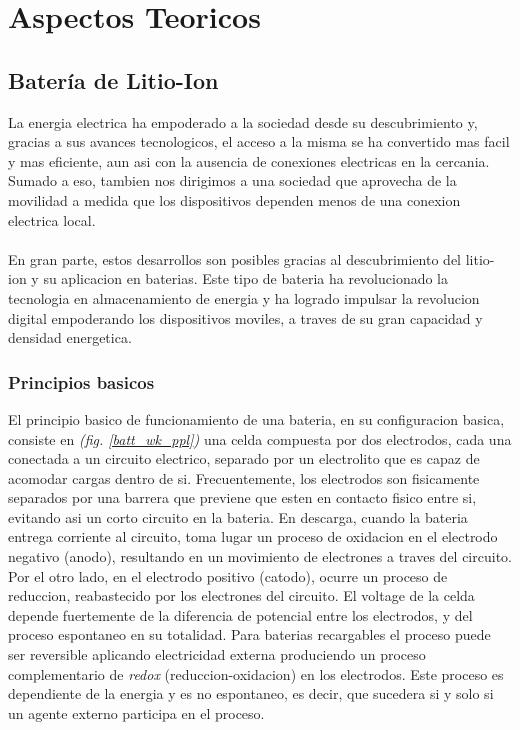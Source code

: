 \documentclass[10pt,a4paper]{article}
\begin{document}
	\clearpage
	
    \section{Aspectos Teoricos}\label{teoria}
	
	\subsection{Batería de Litio-Ion}
    
    La energia electrica ha empoderado a la sociedad desde su 
    descubrimiento y, gracias a sus avances tecnologicos, el acceso a la misma 
    se ha convertido mas facil y mas eficiente, aun asi con la
    ausencia de conexiones electricas en la cercania. Sumado a eso, tambien
    nos dirigimos a una sociedad que aprovecha de la movilidad a medida que los
    dispositivos dependen menos de una conexion electrica local.\\
    \\
    \noindent En gran parte, estos desarrollos son posibles gracias al
    descubrimiento del litio-ion y su aplicacion en baterias. Este tipo de
    bateria ha revolucionado la tecnologia en almacenamiento de energia y ha
    logrado impulsar la revolucion digital empoderando los dispositivos moviles,
    a traves de su gran capacidad y densidad energetica.

    \subsubsection{Principios basicos}

    El principio basico de funcionamiento de una bateria, en su configuracion
    basica, consiste en \emph{(fig. \ref{batt_wk_ppl})} una celda 
    compuesta por dos electrodos, cada una conectada a un circuito 
    electrico, separado por un electrolito que es capaz de acomodar cargas
    dentro de si. Frecuentemente, los electrodos son fisicamente separados por
    una barrera que previene que esten en contacto fisico entre si, evitando asi
    un corto circuito en la bateria. En descarga, cuando la bateria
    entrega corriente al circuito, toma lugar un proceso de oxidacion en el
    electrodo negativo (anodo), resultando en un movimiento de electrones a
    traves del circuito. Por el otro lado, en el electrodo positivo (catodo),
    ocurre un proceso de reduccion, reabastecido por los electrones del
    circuito. El voltage de la celda depende fuertemente de la diferencia de
    potencial entre los electrodos, y del proceso espontaneo en su totalidad.
    Para baterias recargables el proceso puede ser reversible aplicando
    electricidad externa produciendo un proceso complementario de \emph{redox}
    (reduccion-oxidacion) en los electrodos. Este proceso es dependiente de la
    energia y es no espontaneo, es decir, que sucedera si y solo si un agente
    externo participa en el proceso.
\end{document}
